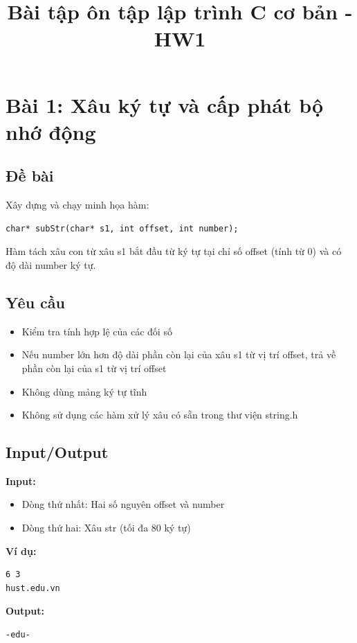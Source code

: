 \documentclass[12pt,a4paper]{article}
\title{\textbf{Bài tập ôn tập lập trình C cơ bản - HW1}}
\author{}
\date{}
\begin{document}
\maketitle

\section{Bài 1: Xâu ký tự và cấp phát bộ nhớ động}

\subsection{Đề bài}
Xây dựng và chạy minh họa hàm:
\begin{verbatim}
char* subStr(char* s1, int offset, int number);
\end{verbatim}

Hàm tách xâu con từ xâu s1 bắt đầu từ ký tự tại chỉ số offset (tính từ 0) và có độ dài number ký tự.

\subsection{Yêu cầu}
\begin{itemize}
    \item Kiểm tra tính hợp lệ của các đối số
    \item Nếu number lớn hơn độ dài phần còn lại của xâu s1 từ vị trí offset, trả về phần còn lại của s1 từ vị trí offset
    \item Không dùng mảng ký tự tĩnh
    \item Không sử dụng các hàm xử lý xâu có sẵn trong thư viện string.h
\end{itemize}

\subsection{Input/Output}
\textbf{Input:}
\begin{itemize}
    \item Dòng thứ nhất: Hai số nguyên offset và number
    \item Dòng thứ hai: Xâu str (tối đa 80 ký tự)
\end{itemize}

\textbf{Ví dụ:}
\begin{verbatim}
6 3
hust.edu.vn
\end{verbatim}

\textbf{Output:}
\begin{verbatim}
-edu-
\end{verbatim}
\end{document}
